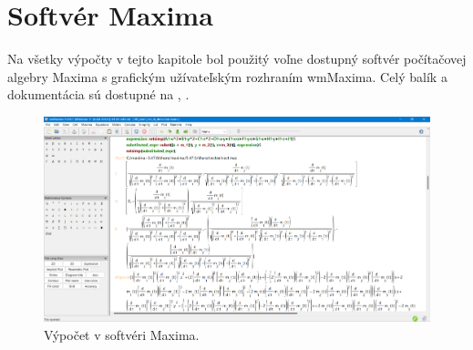 \section{Softvér Maxima}
Na všetky výpočty v tejto kapitole bol použitý voľne dostupný softvér počítačovej algebry Maxima s grafickým užívateľským rozhraním wmMaxima. Celý balík a dokumentácia sú dostupné na \cite{MaximaDoc}, \cite{MaximaDownload}.

\begin{figure}[h]
	\centering
	\includegraphics[width=\textwidth]{images/maxima.png}
	\caption[Softvér Maxima.]{Výpočet v softvéri Maxima.}
	\label{fig:3D_point_lies}
\end{figure}

